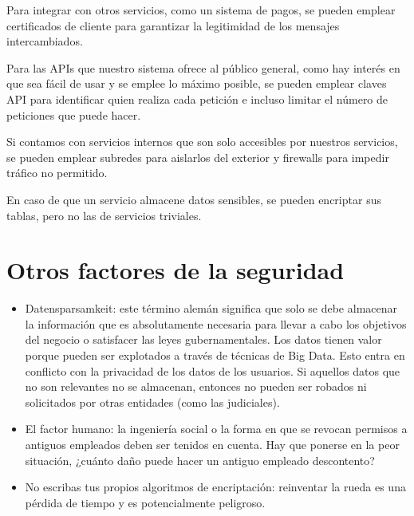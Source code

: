 \documentclass[11pt,a4paper]{article}
\begin{document}
Para integrar con otros servicios, como un sistema de pagos, se pueden emplear certificados de cliente para garantizar la legitimidad de los mensajes intercambiados.

Para las APIs que nuestro sistema ofrece al público general, como hay interés en que sea fácil de usar y se emplee lo máximo posible, se pueden emplear claves API para identificar quien realiza cada petición e incluso limitar el número de peticiones que puede hacer.

Si contamos con servicios internos que son solo accesibles por nuestros servicios, se pueden emplear subredes para aislarlos del exterior y firewalls para impedir tráfico no permitido. 

En caso de que un servicio almacene datos sensibles, se pueden encriptar sus tablas, pero no las de servicios triviales.

\section{Otros factores de la seguridad}

\begin{itemize}

\item Datensparsamkeit: este término alemán significa que solo se debe almacenar la información que es absolutamente necesaria para llevar a cabo los objetivos del negocio o satisfacer las leyes gubernamentales. Los datos tienen valor porque pueden ser explotados a través de técnicas de Big Data. Esto entra en conflicto con la privacidad de los datos de los usuarios. Si aquellos datos que no son relevantes no se almacenan, entonces no pueden ser robados ni solicitados por otras entidades (como las judiciales).

\item El factor humano: la ingeniería social o la forma en que se revocan permisos a antiguos empleados deben ser tenidos en cuenta. Hay que ponerse en la peor situación, ¿cuánto daño puede hacer un antiguo empleado descontento?

\item No escribas tus propios algoritmos de encriptación: reinventar la rueda es una pérdida de tiempo y es potencialmente peligroso.

\end{itemize}
\end{document}
